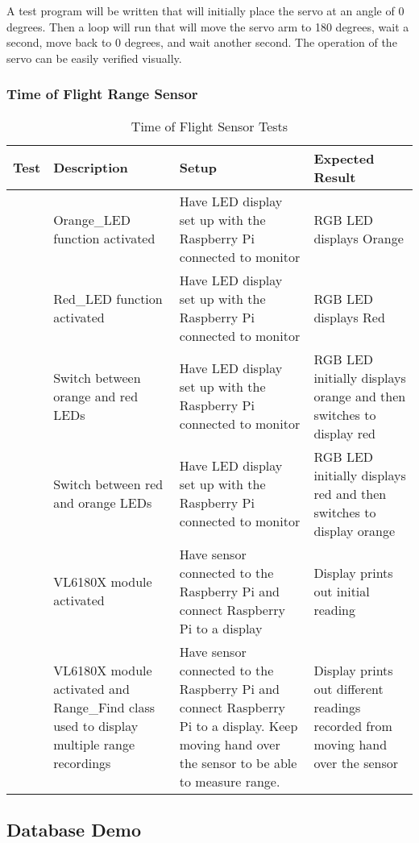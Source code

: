 A test program will be written that will initially place the servo at an angle
of 0 degrees.  Then a loop will run that will move the servo arm to 180 degrees,
wait a second, move back to 0 degrees, and wait another second.  The operation
of the servo can be easily verified visually.

\subsubsection{Time of Flight Range Sensor}

\begin{table*}[htb]
\centering
\begin{tabular}{>{\centering\arraybackslash}m{0.75cm}|>{\centering\arraybackslash}m{4cm}|>{\centering\arraybackslash}m{4.5cm}|>{\centering\arraybackslash}m{4cm}}
\toprule
Test & Description & Setup & Expected Result \\
\midrule
1 & Orange\_LED function activated & Have LED display set up with the Raspberry
Pi connected to monitor & RGB LED displays Orange \\
\hline
2 & Red\_LED function activated & Have LED display set up with the Raspberry Pi
connected to monitor & RGB LED displays Red \\
\hline
3 & Switch between orange and red LEDs & Have LED display set up with the
Raspberry Pi connected to monitor & RGB LED initially displays orange and then
switches to display red \\
\hline
4 & Switch between red and orange LEDs & Have LED display set up with the
Raspberry Pi connected to monitor & RGB LED initially displays red and then
switches to display orange \\
\hline
5 & VL6180X module activated & Have sensor connected to the Raspberry Pi and
connect Raspberry Pi to a display & Display prints out initial reading \\
\hline
6 & VL6180X module activated and Range\_Find class used to display multiple
range recordings & Have sensor connected to the Raspberry Pi and connect
Raspberry Pi to a display. Keep moving hand over the sensor to be able to
measure range. & Display prints out different readings recorded from moving
hand over the sensor \\
\bottomrule
\end{tabular}
\caption{Time of Flight Sensor Tests}
\label{table:tof-tests}
\end{table*}

\subsection{Database Demo}

